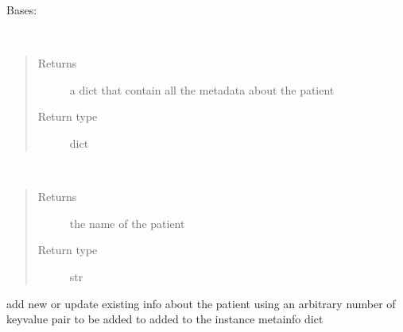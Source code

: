 \documentclass[letterpaper,10pt,english]{sphinxmanual}
\begin{document}
\begin{fulllineitems}
\label{\detokenize{IPTK.Classes:IPTK.Classes.Proband.Proband}}
Bases: 

\begin{fulllineitems}
\label{\detokenize{IPTK.Classes:IPTK.Classes.Proband.Proband.get_meta_data}}~\begin{quote}\begin{description}
\item[{Returns}] \leavevmode
a dict that contain all the meta\sphinxhyphen{}data about the patient

\item[{Return type}] \leavevmode
dict

\end{description}\end{quote}

\end{fulllineitems}


\begin{fulllineitems}
\label{\detokenize{IPTK.Classes:IPTK.Classes.Proband.Proband.get_name}}~\begin{quote}\begin{description}
\item[{Returns}] \leavevmode
the name of the patient

\item[{Return type}] \leavevmode
str

\end{description}\end{quote}

\end{fulllineitems}


\begin{fulllineitems}
\label{\detokenize{IPTK.Classes:IPTK.Classes.Proband.Proband.update_info}}
add new or update existing info about the patient  using an arbitrary number of key\sphinxhyphen{}value pair to be added to added to the instance meta\sphinxhyphen{}info dict

\end{fulllineitems}


\end{fulllineitems}
\end{document}
